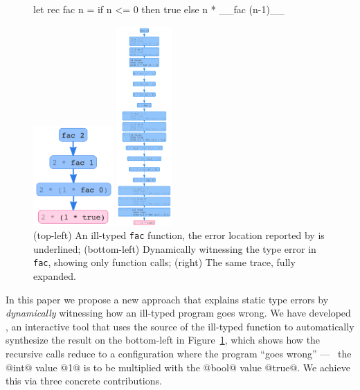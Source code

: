 \begin{figure}[t]
\centering
\begin{minipage}{.49\linewidth}
\centering
\begin{ecode}
  let rec fac n =
    if n <= 0 then
      true
    else
      n * __fac (n-1)__
\end{ecode}
\vspace{2em}
\includegraphics[height=1.5in]{fac-overview.png}
\end{minipage}
\begin{minipage}{.49\linewidth}
\centering
\includegraphics[height=3in]{fac-long.png}
\end{minipage}
\vspace{1em}
\caption{(top-left) An ill-typed \texttt{fac} function, the error location reported by \ocaml is underlined; (bottom-left) Dynamically witnessing the type error in \texttt{fac}, showing only function calls; (right) The same trace, fully expanded.}
\label{fig:factorial}
\end{figure}

In this paper we propose a new approach that explains
static type errors by \emph{dynamically} witnessing
how an ill-typed program goes wrong.
%
We have developed \toolname, an interactive tool that uses
the source of the ill-typed function to automatically synthesize
the result on the bottom-left in Figure~\ref{fig:factorial}, which
shows how the recursive calls reduce to a configuration where
the program ``goes wrong'' --- \ie\ the @int@ value @1@ is to be
multiplied with the @bool@ value @true@.
We achieve this via three concrete contributions.

